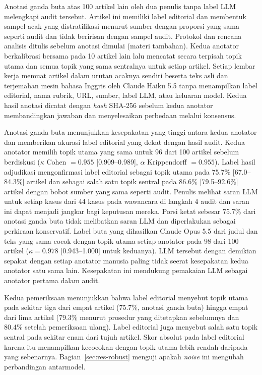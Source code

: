 \documentclass{ieeeaccess}
\newcommand{\en}[1]{\textit{#1}}
\begin{document}
Anotasi ganda buta atas 100 artikel lain oleh dua penulis tanpa label LLM melengkapi audit tersebut. Artikel ini memiliki label editorial dan membentuk sampel acak yang distratifikasi menurut sumber dengan proporsi yang sama seperti audit dan tidak beririsan dengan sampel audit. Protokol dan rencana analisis ditulis sebelum anotasi dimulai (materi tambahan). Kedua anotator berkalibrasi bersama pada 10 artikel lain lalu mencatat secara terpisah topik utama dan semua topik yang sama sentralnya untuk setiap artikel. Setiap lembar kerja memuat artikel dalam urutan acaknya sendiri beserta teks asli dan terjemahan mesin bahasa Inggris oleh Claude Haiku 5.5 tanpa menampilkan label editorial, nama rubrik, URL, sumber, label LLM, atau keluaran model. Kedua hasil anotasi dicatat dengan \en{hash} SHA-256 sebelum kedua anotator membandingkan jawaban dan menyelesaikan perbedaan melalui konsensus.

Anotasi ganda buta menunjukkan kesepakatan yang tinggi antara kedua anotator dan memberikan akurasi label editorial yang dekat dengan hasil audit. Kedua anotator memilih topik utama yang sama untuk 96 dari 100 artikel sebelum berdiskusi ($\kappa$ Cohen $=0.955$ [0.909--0.989], $\alpha$ Krippendorff $=0.955$). Label hasil adjudikasi mengonfirmasi label editorial sebagai topik utama pada 75.7\% [67.0--84.3\%] artikel dan sebagai salah satu topik sentral pada 86.6\% [79.5--92.6\%] artikel dengan bobot sumber yang sama seperti audit. Penulis melihat saran LLM untuk setiap kasus dari 44 kasus pada wawancara di langkah 4 audit dan saran ini dapat menjadi jangkar bagi keputusan mereka. Porsi ketat sebesar 75.7\% dari anotasi ganda buta tidak melibatkan saran LLM dan diperlakukan sebagai perkiraan konservatif. Label buta yang dihasilkan Claude Opus 5.5 dari judul dan teks yang sama cocok dengan topik utama setiap anotator pada 98 dari 100 artikel ($\kappa=0.978$ [0.943--1.000] untuk keduanya). LLM tersebut dengan demikian sepakat dengan setiap anotator manusia paling tidak seerat kesepakatan kedua anotator satu sama lain. Kesepakatan ini mendukung pemakaian LLM sebagai anotator pertama dalam audit.

Kedua pemeriksaan menunjukkan bahwa label editorial menyebut topik utama pada sekitar tiga dari empat artikel (75.7\%, anotasi ganda buta) hingga empat dari lima artikel (79.3\% menurut prosedur yang ditetapkan sebelumnya dan 80.4\% setelah pemeriksaan ulang). Label editorial juga menyebut salah satu topik sentral pada sekitar enam dari tujuh artikel. Skor absolut pada label editorial karena itu menampilkan kecocokan dengan topik utama lebih rendah daripada yang sebenarnya. Bagian~\ref{sec:res-robust} menguji apakah \en{noise} ini mengubah perbandingan antarmodel.
\end{document}
